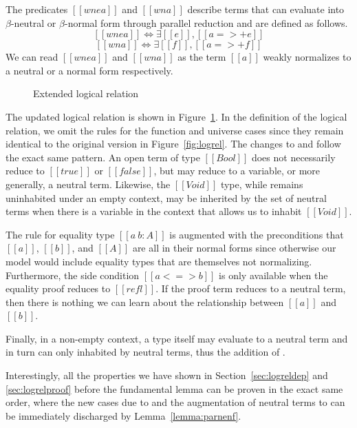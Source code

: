\documentclass[acmsmall,screen=true,
\ifpublic review=false\else,review=true\fi
  ,anonymous=\ifanonymous true\else false\fi]{acmart}
\begin{document}
The predicates $[[wne a]]$ and $[[wn
a]]$ describe terms that can evaluate into $\beta$-neutral or
$\beta$-normal form through parallel reduction and are defined as
follows.
\[ [[wne a]] \iff \exists [[e]], [[a =>+ e]] \]
\[ [[wn a]] \iff \exists [[f]], [[a =>+ f]] \]
We can read $[[wne a]]$ and $[[wn a]]$ as the term $[[a]]$ weakly normalizes to a neutral or a normal form respectively.

\begin{figure}[h]
  \caption{Extended logical relation}
  \label{fig:logrelopen}
\end{figure}

The updated logical relation is shown
in Figure~\ref{fig:logrelopen}.
In the definition of the logical relation, we omit the rules for
the function and universe cases since they remain identical to the
original version in Figure~\ref{fig:logrel}.
The changes to  and  follow the exact same pattern.
An open term of type $[[Bool]]$ does
not necessarily reduce to $[[true]]$ or $[[false]]$, but may reduce to
a variable, or more generally, a neutral term. Likewise, the
$[[Void]]$ type, while remains uninhabited under an empty context, may
be inherited by the set of neutral terms when there is a variable in
the context that allows us to inhabit $[[Void]]$.

The rule for equality type $[[a ~ b : A]]$ is augmented with the preconditions that
$[[a]]$, $[[b]]$, and $[[A]]$ are all in their normal forms since
otherwise our model would include equality types that are themselves
not normalizing. Furthermore, the side condition $[[a <=> b]]$ is only
available when the equality proof reduces to $[[refl]]$. If the proof
term reduces to a neutral term, then there is nothing we can learn
about the relationship between $[[a]]$ and $[[b]]$.

Finally, in a
non-empty context, a type itself may evaluate to a neutral term and in
turn can only inhabited by neutral terms, thus the addition of .

Interestingly, all the properties we have shown in
Section~\ref{sec:logreldep} and \ref{sec:logrelproof} before the
fundamental lemma can be proven in the exact same order, where the new
cases due to  and the augmentation of neutral terms
to  can be immediately discharged by
Lemma~\ref{lemma:parnenf}.
\end{document}
